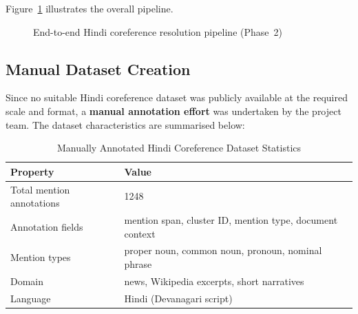 \documentclass[12pt,a4paper]{report}
\begin{document}
Figure~\ref{fig:system_arch} illustrates the overall pipeline.

\begin{figure}[H]
\centering
{}
\caption{End-to-end Hindi coreference resolution pipeline (Phase~2)}
\label{fig:system_arch}
\end{figure}

\subsection{Manual Dataset Creation}

Since no suitable Hindi coreference dataset was publicly available at the required scale and format, a \textbf{manual annotation effort} was undertaken by the project team. The dataset characteristics are summarised below:

\begin{table}[H]
\centering
\caption{Manually Annotated Hindi Coreference Dataset Statistics}
\begin{tabular}{|l|l|}
\hline
\textbf{Property} & \textbf{Value} \\
\hline
Total mention annotations & 1248 \\
Annotation fields & mention span, cluster ID, mention type, document context \\
Mention types & proper noun, common noun, pronoun, nominal phrase \\
Domain & news, Wikipedia excerpts, short narratives \\
Language & Hindi (Devanagari script) \\
\hline
\end{tabular}
\end{table}
\end{document}
